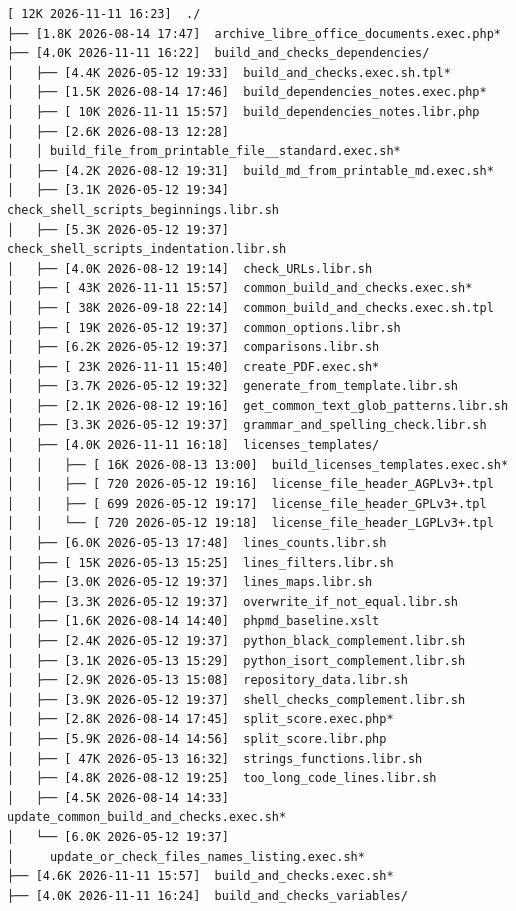 \documentclass{article}
\begin{document}
\begin{verbatim}
[ 12K 2026-11-11 16:23]  ./
├── [1.8K 2026-08-14 17:47]  archive_libre_office_documents.exec.php*
├── [4.0K 2026-11-11 16:22]  build_and_checks_dependencies/
│   ├── [4.4K 2026-05-12 19:33]  build_and_checks.exec.sh.tpl*
│   ├── [1.5K 2026-08-14 17:46]  build_dependencies_notes.exec.php*
│   ├── [ 10K 2026-11-11 15:57]  build_dependencies_notes.libr.php
│   ├── [2.6K 2026-08-13 12:28]
│   │ build_file_from_printable_file__standard.exec.sh*
│   ├── [4.2K 2026-08-12 19:31]  build_md_from_printable_md.exec.sh*
│   ├── [3.1K 2026-05-12 19:34]  check_shell_scripts_beginnings.libr.sh
│   ├── [5.3K 2026-05-12 19:37]  check_shell_scripts_indentation.libr.sh
│   ├── [4.0K 2026-08-12 19:14]  check_URLs.libr.sh
│   ├── [ 43K 2026-11-11 15:57]  common_build_and_checks.exec.sh*
│   ├── [ 38K 2026-09-18 22:14]  common_build_and_checks.exec.sh.tpl
│   ├── [ 19K 2026-05-12 19:37]  common_options.libr.sh
│   ├── [6.2K 2026-05-12 19:37]  comparisons.libr.sh
│   ├── [ 23K 2026-11-11 15:40]  create_PDF.exec.sh*
│   ├── [3.7K 2026-05-12 19:32]  generate_from_template.libr.sh
│   ├── [2.1K 2026-08-12 19:16]  get_common_text_glob_patterns.libr.sh
│   ├── [3.3K 2026-05-12 19:37]  grammar_and_spelling_check.libr.sh
│   ├── [4.0K 2026-11-11 16:18]  licenses_templates/
│   │   ├── [ 16K 2026-08-13 13:00]  build_licenses_templates.exec.sh*
│   │   ├── [ 720 2026-05-12 19:16]  license_file_header_AGPLv3+.tpl
│   │   ├── [ 699 2026-05-12 19:17]  license_file_header_GPLv3+.tpl
│   │   └── [ 720 2026-05-12 19:18]  license_file_header_LGPLv3+.tpl
│   ├── [6.0K 2026-05-13 17:48]  lines_counts.libr.sh
│   ├── [ 15K 2026-05-13 15:25]  lines_filters.libr.sh
│   ├── [3.0K 2026-05-12 19:37]  lines_maps.libr.sh
│   ├── [3.3K 2026-05-12 19:37]  overwrite_if_not_equal.libr.sh
│   ├── [1.6K 2026-08-14 14:40]  phpmd_baseline.xslt
│   ├── [2.4K 2026-05-12 19:37]  python_black_complement.libr.sh
│   ├── [3.1K 2026-05-13 15:29]  python_isort_complement.libr.sh
│   ├── [2.9K 2026-05-13 15:08]  repository_data.libr.sh
│   ├── [3.9K 2026-05-12 19:37]  shell_checks_complement.libr.sh
│   ├── [2.8K 2026-08-14 17:45]  split_score.exec.php*
│   ├── [5.9K 2026-08-14 14:56]  split_score.libr.php
│   ├── [ 47K 2026-05-13 16:32]  strings_functions.libr.sh
│   ├── [4.8K 2026-08-12 19:25]  too_long_code_lines.libr.sh
│   ├── [4.5K 2026-08-14 14:33]  update_common_build_and_checks.exec.sh*
│   └── [6.0K 2026-05-12 19:37]
│     update_or_check_files_names_listing.exec.sh*
├── [4.6K 2026-11-11 15:57]  build_and_checks.exec.sh*
├── [4.0K 2026-11-11 16:24]  build_and_checks_variables/

\end{verbatim}
\end{document}
